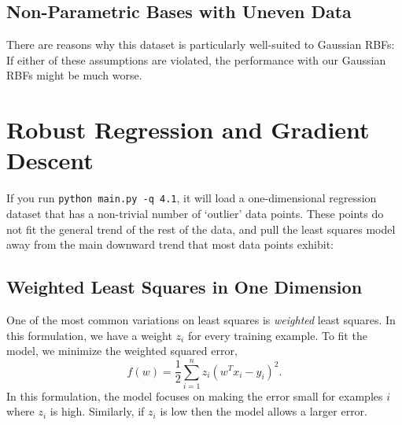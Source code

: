 \documentclass{article}
\begin{document}
\subsection{Non-Parametric Bases with Uneven Data}

There are reasons why this dataset is particularly well-suited to Gaussian RBFs:
If either of these assumptions are violated, the performance with our Gaussian RBFs might be much worse.


\section{Robust Regression and Gradient Descent}

If you run \verb|python main.py -q 4.1|, it will load a one-dimensional regression 
dataset that has a non-trivial number of `outlier' data points. 
These points do not fit the general trend of the rest of the data, 
and pull the least squares model away from the main downward trend that most data points exhibit:

\subsection{Weighted Least Squares in One Dimension}

One of the most common variations on least squares is \emph{weighted} least squares. In this formulation, we have a weight $z_i$ for every training example. To fit the model, we minimize the weighted squared error,
\[
f(w) =  \frac{1}{2}\sum_{i=1}^n z_i(w^Tx_i - y_i)^2.
\]
In this formulation, the model focuses on making the error small for examples $i$ where $z_i$ is high. Similarly, if $z_i$ is low then the model allows a larger error.
\end{document}
